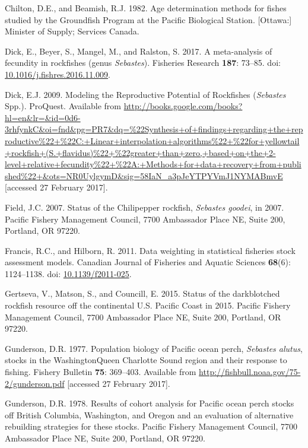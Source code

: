 \documentclass[12pt,]{article}
\begin{document}
\hypertarget{ref-chilton_age_1982}{}
Chilton, D.E., and Beamish, R.J. 1982. Age determination methods for
fishes studied by the Groundfish Program at the Pacific Biological
Station. {[}Ottawa:{]} Minister of Supply; Services Canada.

\hypertarget{ref-dick_meta-analysis_2017}{}
Dick, E., Beyer, S., Mangel, M., and Ralston, S. 2017. A meta-analysis
of fecundity in rockfishes (genus \emph{Sebastes}). Fisheries Research
\textbf{187}: 73--85. doi:
\href{https://doi.org/10.1016/j.fishres.2016.11.009}{10.1016/j.fishres.2016.11.009}.

\hypertarget{ref-dick_modeling_2009}{}
Dick, E.J. 2009. Modeling the Reproductive Potential of Rockfishes
(\emph{Sebastes} Spp.). ProQuest. Available from
\url{http://books.google.com/books?hl=en\&lr=\&id=0d6-3rhfynkC\&oi=fnd\&pg=PR7\&dq=\%22Synthesis+of+findings+regarding+the+reproductive\%22+\%22C:+Linear+interpolation+algorithms\%22+\%22for+yellowtail+rockfish+(S.+flavidus)\%22+\%22greater+than+zero,+based+on+the+2-level+relative+fecundity\%22+\%22A:+Methods+for+data+recovery+from+published\%22+\&ots=NR0UylgymD\&sig=58IaN_a3pJeYTPYVmJ1NYMABmvE}
{[}accessed 27 February 2017{]}.

\hypertarget{ref-field_status_2007}{}
Field, J.C. 2007. Status of the Chilipepper rockfish, \emph{Sebastes
goodei}, in 2007. Pacific Fishery Management Council, 7700 Ambassador
Place NE, Suite 200, Portland, OR 97220.

\hypertarget{ref-francis_data_2011}{}
Francis, R.C., and Hilborn, R. 2011. Data weighting in statistical
fisheries stock assessment models. Canadian Journal of Fisheries and
Aquatic Sciences \textbf{68}(6): 1124--1138. doi:
\href{https://doi.org/10.1139/f2011-025}{10.1139/f2011-025}.

\hypertarget{ref-gertseva_status_2015}{}
Gertseva, V., Matson, S., and Councill, E. 2015. Status of the
darkblotched rockfish resource off the continental U.S. Pacific Coast in
2015. Pacific Fishery Management Council, 7700 Ambassador Place NE,
Suite 200, Portland, OR 97220.

\hypertarget{ref-gunderson_population_1977}{}
Gunderson, D.R. 1977. Population biology of Pacific ocean perch,
\emph{Sebastes alutus}, stocks in the WashingtonQueen Charlotte Sound
region and their response to fishing. Fishery Bulletin \textbf{75}:
369--403. Available from
\url{http://fishbull.noaa.gov/75-2/gunderson.pdf} {[}accessed 27
February 2017{]}.

\hypertarget{ref-gunderson_results_1978}{}
Gunderson, D.R. 1978. Results of cohort analysis for Pacific ocean perch
stocks off British Columbia, Washington, and Oregon and an evaluation of
alternative rebuilding strategies for these stocks. Pacific Fishery
Management Council, 7700 Ambassador Place NE, Suite 200, Portland, OR
97220.
\end{document}
